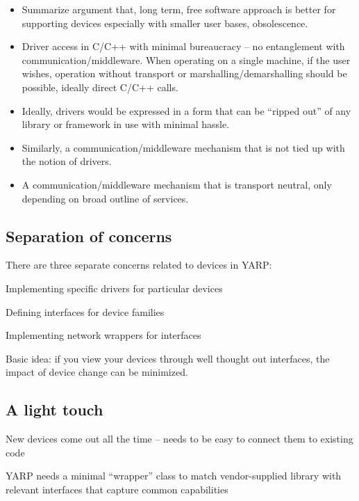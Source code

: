 \begin{itemize}

\item Summarize argument that, long term, free software approach 
is better for supporting devices especially with smaller user
bases, obsolescence.


\item Driver access in C/C++ with minimal bureaucracy -- no
entanglement with communication/middleware.  When operating
on a single machine, if the user wishes, operation without
transport or marshalling/demarshalling should be possible, ideally
direct C/C++ calls.

\item Ideally, drivers would be expressed in a form that
can be ``ripped out'' of any library or framework in use
with minimal hassle.

\item Similarly, a communication/middleware mechanism that is 
not tied up with the notion of drivers.

\item A communication/middleware mechanism that is transport
neutral, only depending on broad outline of services.


\end{itemize}




\subsection{Separation of concerns}

There are three separate concerns related to devices in YARP:

Implementing specific drivers for particular devices 

Defining interfaces for device families 

Implementing network wrappers for interfaces

Basic idea: if you view your devices through well thought out
interfaces, the impact of device change can be minimized.


\subsection{A light touch}

New devices come out all the time -- needs to be easy to connect them
to existing code

YARP needs a minimal ``wrapper'' class to match vendor-supplied
library with relevant interfaces that capture common capabilities

